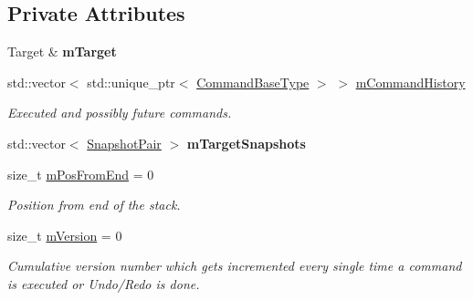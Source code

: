 \subsection*{Private Attributes}
\begin{DoxyCompactItemize}
\item 
\mbox{\label{classpepr3d_1_1_command_manager_a9a6320349ad160fa9ca7a6c83fa2802a}} 
Target \& {\bfseries m\+Target}
\item 
\mbox{\label{classpepr3d_1_1_command_manager_a55847061c90eb00139370aa16d88a52a}} 
std\+::vector$<$ std\+::unique\+\_\+ptr$<$ \mbox{\hyperlink{classpepr3d_1_1_command_base}{Command\+Base\+Type}} $>$ $>$ \mbox{\hyperlink{classpepr3d_1_1_command_manager_a55847061c90eb00139370aa16d88a52a}{m\+Command\+History}}
\begin{DoxyCompactList}\small\item\em Executed and possibly future commands. \end{DoxyCompactList}\item 
\mbox{\label{classpepr3d_1_1_command_manager_a13e29779a7f1d4464306c952b96f0e94}} 
std\+::vector$<$ \mbox{\hyperlink{structpepr3d_1_1_command_manager_1_1_snapshot_pair}{Snapshot\+Pair}} $>$ {\bfseries m\+Target\+Snapshots}
\item 
\mbox{\label{classpepr3d_1_1_command_manager_ae1b91a069626a707e392bdb92772a487}} 
size\+\_\+t \mbox{\hyperlink{classpepr3d_1_1_command_manager_ae1b91a069626a707e392bdb92772a487}{m\+Pos\+From\+End}} = 0
\begin{DoxyCompactList}\small\item\em Position from end of the stack. \end{DoxyCompactList}\item 
\mbox{\label{classpepr3d_1_1_command_manager_a4c73b4cacd523878dbef2cb7ed4805fa}} 
size\+\_\+t \mbox{\hyperlink{classpepr3d_1_1_command_manager_a4c73b4cacd523878dbef2cb7ed4805fa}{m\+Version}} = 0
\begin{DoxyCompactList}\small\item\em Cumulative version number which gets incremented every single time a command is executed or Undo/\+Redo is done. \end{DoxyCompactList}\end{DoxyCompactItemize}


